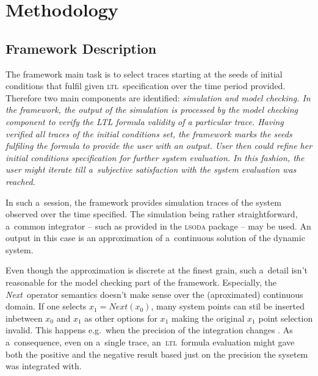 \documentclass[11pt]{fithesis}
\newcommand{\ltl}{\textsc{ltl}~}
\newcommand{\Next}{\emph{Next}~}
\begin{document}
\FrontMatter
\ThesisTitlePage

\begin{ThesisDeclaration}
\DeclarationText
\AdvisorName
\end{ThesisDeclaration}




\MainMatter
\tableofcontents
\chapter{Methodology}
\section{Framework Description}
The framework main task is to select traces starting at the seeds of initial conditions
that fulfil given \ltl specification over the time period provided.
Therefore two main components are identified: \em simulation and model checking\rm{}.
In the framework, the output of the simulation is processed by the
model checking component to verify the LTL formula validity of a particular
trace. Having verified all traces of the initial conditions set, the framework
marks the seeds fulfiling the formula to provide the user with an output. 
User then could refine her initial conditions specification for further
system evaluation. In this fashion, the user might iterate till a~subjective satisfaction
with the system evaluation was reached.

In such a~session, the framework provides simulation traces of the system observed over
the time specified. The simulation being rather straightforward, a~common integrator -- such as provided in the \textsc{lsoda}
\cite{lsoda} package -- may be used.
An output in this case is an approximation of a~continuous solution of the dynamic system.

Even though the approximation is discrete at the finest grain, such a~detail isn't reasonable
for the model checking part of the framework. Especially, the \Next operator semantics doesn't make sense over the
(aproximated) continuous domain. If one selects $x_1 = Next(x_0)$, many system points can stil be inserted
inbetween $x_0$ and $x_1$ as other options for $x_1$ making the original $x_1$ point selection invalid.
This happens e.g.~when the precision of the integration changes \cite{integration}.
As a~consequence, even on a~single trace, an~\ltl formula evaluation might gave both the positive and the negative result
based just on the precision the sysetem was integrated with. 
\end{document}

